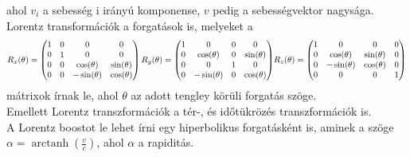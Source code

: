 \documentclass[12pt,a4paper]{article}
\DeclareMathOperator\arctanh{arctanh}
\begin{document}
ahol $v_i$ a sebesség i irányú komponense, $v$ pedig a sebességvektor nagysága.\\
Lorentz transformációk a forgatások is, melyeket a
\begin{equation}
R_x(\theta)=\begin{pmatrix}
1 & 0 & 0 & 0 \\
0 & 1 & 0 & 0 \\
0 & 0 & \cos(\theta) & \sin(\theta) \\
0 & 0 & -\sin(\theta) & \cos(\theta) \\
\end{pmatrix}
R_y(\theta)=\begin{pmatrix}
1 & 0 & 0 & 0 \\
0 & \cos(\theta) & 0 & \sin(\theta) \\
0 & 0 & 1 & 0 \\
0 & -\sin(\theta) & 0 & \cos(\theta) \\
\end{pmatrix}$$$$
R_z(\theta)=\begin{pmatrix}
1 & 0 & 0 & 0 \\
0 & \cos(\theta) & \sin(\theta) & 0 \\
0 & -\sin(\theta) & \cos(\theta) & 0 \\
0 & 0 & 0 & 1 \\
\end{pmatrix}
\end{equation}
mátrixok írnak le, ahol $\theta$ az adott tengley körüli forgatás szöge.\\
\bigskip
Emellett Lorentz transzformációk a tér-, és időtükrözés transzformációk is.\\
A Lorentz boostot le lehet írni egy hiperbolikus forgatásként is, aminek a szöge $\alpha=\arctanh \left(\frac{v}{c}\right)$, ahol $\alpha$ a rapiditás.
\end{document}
